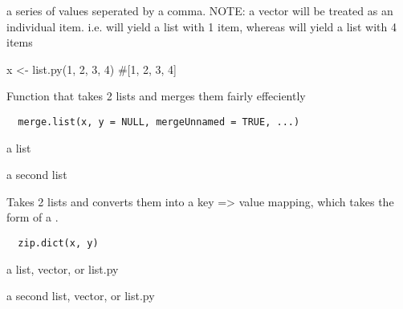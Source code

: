 \documentclass[a4paper]{book}
\begin{document}
%
\begin{Arguments}
\begin{ldescription}
\item[\code{...}] a series of values seperated by a comma. NOTE:
a vector will be treated as an individual item. i.e.
 will yield a list with 1 item,
whereas  will yield a list with
4 items
\end{ldescription}
\end{Arguments}
%
\begin{Examples}
\begin{ExampleCode}
x <- list.py(1, 2, 3, 4)
#[1, 2, 3, 4]
\end{ExampleCode}
\end{Examples}
%
\begin{Description}\relax
Function that takes 2 lists and merges them fairly
effeciently
\end{Description}
%
\begin{Usage}
\begin{verbatim}
  merge.list(x, y = NULL, mergeUnnamed = TRUE, ...)
\end{verbatim}
\end{Usage}
%
\begin{Arguments}
\begin{ldescription}
\item[\code{x}] a list

\item[\code{y}] a second list
\end{ldescription}
\end{Arguments}
%
\begin{Description}\relax
Takes 2 lists and converts them into a key => value
mapping, which takes the form of a .
\end{Description}
%
\begin{Usage}
\begin{verbatim}
  zip.dict(x, y)
\end{verbatim}
\end{Usage}
%
\begin{Arguments}
\begin{ldescription}
\item[\code{x}] a list, vector, or list.py

\item[\code{y}] a second list, vector, or list.py
\end{ldescription}
\end{Arguments}
\end{document}
